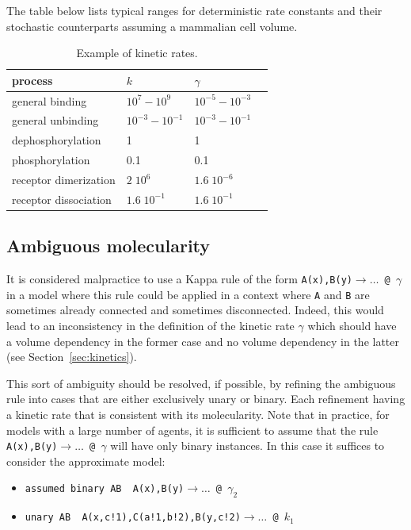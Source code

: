 \documentclass[11pt]{book}
\def\ttt#1{\texttt{#1}}
\def\rar{\rightarrow}
\def\ga{\gamma}
\begin{document}
The table below lists typical ranges for deterministic rate constants and 
their stochastic counterparts assuming a mammalian cell volume.

\begin{table}[htbp]
\centering
\caption{Example of kinetic rates.}
\begin{tabular}{@{} lllr @{} }
\toprule
process & $k$ & $\gamma$ %
\\
\midrule
general binding & $10^{7}-10^{9}$ & $10^{-5}-10^{-3}$ %
\\
general unbinding &  $10^{-3} - 10^{-1}$ & $10^{-3}-10^{-1}$ %
\\
dephosphorylation & 1 & 1 %
\\
phosphorylation & 0.1 & 0.1 %
\\
receptor dimerization & $2\; 10^{6}$ & $1.6 \;10^{-6}$ %
\\
receptor dissociation & $1.6\; 10^{-1}$ & $1.6\; 10^{-1}$ %
\\
\bottomrule
\end{tabular}
\end{table}

\subsection{Ambiguous molecularity}\label{sec:ambiguous}

It is considered malpractice to use a Kappa rule of the form \ttt{A(x),B(y)$\rar \dots$ @ $\ga$} in a model where this rule could be applied in a context where \ttt{A} and \ttt{B} are sometimes already connected and sometimes disconnected. Indeed, this would lead to an inconsistency in the definition of the kinetic rate $\ga$ which should have a volume dependency in the former case and no volume dependency in the latter (see Section~\ref{sec:kinetics}). 

This sort of ambiguity should be resolved, if possible, by refining the ambiguous rule into cases that are either exclusively unary or binary. Each refinement having a kinetic rate that is consistent with its molecularity. Note that in practice, for models with a large number of agents, it is sufficient to assume that the rule \ttt{A(x),B(y)$\rar \dots$ @ $\ga$} will have only binary instances. In this case it suffices to consider the approximate model:
\begin{itemize}
\item[]\ttt{\textquotesingle assumed binary AB\textquotesingle ~  A(x),B(y)$\rar \dots$ @ $\ga_2$}
\item[]\ttt{\textquotesingle unary AB\textquotesingle  ~ A(x,c!1),C(a!1,b!2),B(y,c!2)$\rar \dots$ @ $k_1$}
\end{itemize}
\end{document}
